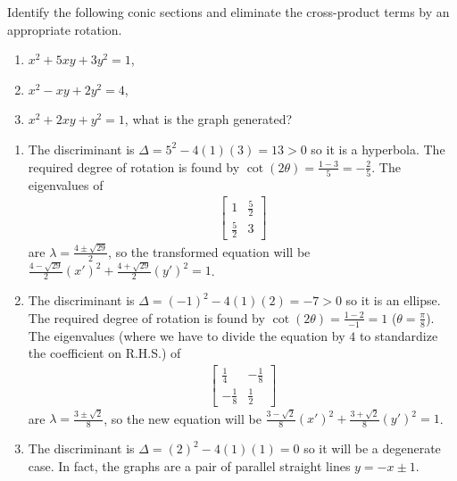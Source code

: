 \begin{Exercise}
Identify the following conic sections and eliminate the cross-product terms by an appropriate rotation.
\begin{enumerate}[label=(\alph*)]
\item $x^2 + 5xy + 3y^2 = 1$,
\item $x^2 - xy + 2y^2 = 4$,
\item $x^2 + 2xy + y^2 = 1$, what is the graph generated? 
\end{enumerate}
\end{Exercise}
\begin{Answer}
\begin{enumerate}[label=(\alph*)]
\item The discriminant is $\Delta = 5^2 - 4(1)(3) = 13 > 0$ so it is a hyperbola. The required degree of rotation is found by $\cot(2\theta) = \frac{1-3}{5} = -\frac{2}{5}$. The eigenvalues of
\begin{align*}
\begin{bmatrix}
1 & \frac{5}{2} \\
\frac{5}{2} & 3
\end{bmatrix}
\end{align*}
are $\lambda = \frac{4 \pm \sqrt{29}}{2}$, so the transformed equation will be \\$\frac{4 - \sqrt{29}}{2}(x')^2 + \frac{4 + \sqrt{29}}{2}(y')^2 = 1$.
\item The discriminant is $\Delta = (-1)^2 - 4(1)(2) = -7 > 0$ so it is an ellipse. The required degree of rotation is found by $\cot(2\theta) = \frac{1-2}{-1} = 1$ ($\theta = \frac{\pi}{8}$). The eigenvalues (where we have to divide the equation by $4$ to standardize the coefficient on R.H.S.) of
\begin{align*}
\begin{bmatrix}
\frac{1}{4} & -\frac{1}{8} \\
-\frac{1}{8} & \frac{1}{2}
\end{bmatrix}
\end{align*}
are $\lambda = \frac{3\pm\sqrt{2}}{8}$, so the new equation will be $\frac{3 - \sqrt{2}}{8}(x')^2 + \frac{3 + \sqrt{2}}{8}(y')^2 = 1$.
\item The discriminant is $\Delta = (2)^2 - 4(1)(1) = 0$ so it will be a degenerate case. In fact, the graphs are a pair of parallel straight lines $y = -x \pm 1$.
\end{enumerate}
\end{Answer}

